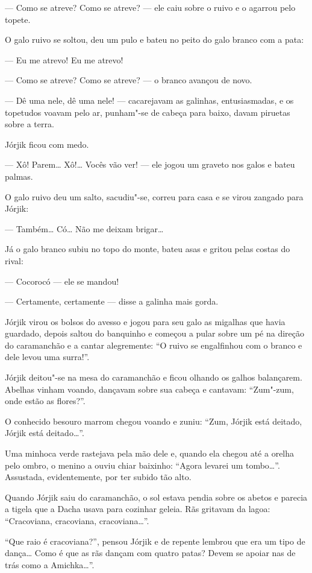 --- Como se atreve? Como se atreve? --- ele caiu sobre o ruivo e o
agarrou pelo topete.

O galo ruivo se soltou, deu um pulo e bateu no peito do galo branco com
a pata:

--- Eu me atrevo! Eu me atrevo!

--- Como se atreve? Como se atreve? --- o branco avançou de novo.

--- Dê uma nele, dê uma nele! --- cacarejavam as galinhas,
entusiasmadas, e os topetudos voavam pelo ar, punham"-se de cabeça para
baixo, davam piruetas sobre a terra.

Jórjik ficou com medo.

--- Xô! Parem\ldots{} Xô!\ldots{} Vocês vão ver! --- ele jogou um graveto nos
galos e bateu palmas.

O galo ruivo deu um salto, sacudiu"-se, correu para casa e se virou
zangado para Jórjik:

--- Também\ldots{} Có\ldots{} Não me deixam brigar\ldots{}

Já o galo branco subiu no topo do monte, bateu asas e gritou pelas
costas do rival:

--- Cocorocó --- ele se mandou!

--- Certamente, certamente --- disse a galinha mais gorda.

Jórjik virou os bolsos do avesso e jogou para seu galo as migalhas que
havia guardado, depois saltou do banquinho e começou a pular sobre um pé
na direção do caramanchão e a cantar alegremente: ``O ruivo se
engalfinhou com o branco e dele levou uma surra!''.

Jórjik deitou"-se na mesa do caramanchão e ficou olhando os galhos
balançarem. Abelhas vinham voando, dançavam sobre sua cabeça e cantavam:
``Zum"-zum, onde estão as flores?''.

O conhecido besouro marrom chegou voando e zuniu: ``Zum, Jórjik está
deitado, Jórjik está deitado\ldots{}''.

Uma minhoca verde rastejava pela mão dele e, quando ela chegou até a
orelha pelo ombro, o menino a ouviu chiar baixinho: ``Agora levarei um
tombo\ldots{}''. Assustada, evidentemente, por ter subido tão alto.

Quando Jórjik saiu do caramanchão, o sol estava pendia sobre os abetos e
parecia a tigela que a Dacha usava para cozinhar geleia. Rãs gritavam da
lagoa: ``Cracoviana, cracoviana, cracoviana\ldots{}''.

``Que raio é cracoviana?'', pensou Jórjik e de repente lembrou que era
um tipo de dança\ldots{} Como é que as rãs dançam com quatro patas? Devem se
apoiar nas de trás como a Amichka\ldots{}''.

